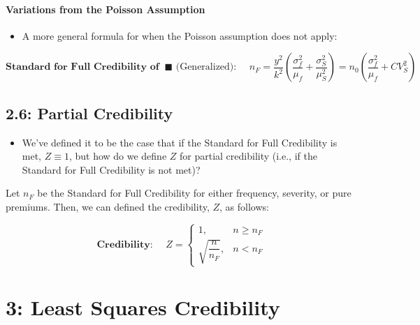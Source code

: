\documentclass[
]{article}
\providecommand{\tightlist}{%
  \setlength{\itemsep}{0pt}\setlength{\parskip}{0pt}}
\begin{document}
\begin{blue}

\hypertarget{variations-from-the-poisson-assumption}{%
\paragraph{Variations from the Poisson
Assumption}\label{variations-from-the-poisson-assumption}}

\begin{itemize}
\tightlist
\item
  A more general formula for when the Poisson assumption does not apply:
\end{itemize}

\[
  \textbf{Standard for Full Credibility of } \  \blacksquare \text{ (Generalized): } \quad n_F = \dfrac{y^2}{k^2}\left( \dfrac{\sigma_f^2}{\mu_f} + \dfrac{\sigma_S^2}{\mu_S^2} \right) = n_0 \left( \dfrac{\sigma_f^2}{\mu_f} + CV_S^2  \right)
\]

\end{blue}

\hypertarget{partial-credibility}{%
\subsection{2.6: Partial Credibility}\label{partial-credibility}}

\begin{itemize}
\tightlist
\item
  We've defined it to be the case that if the Standard for Full
  Credibility is met, \(Z\equiv 1\), but how do we define \(Z\) for
  partial credibility (i.e., if the Standard for Full Credibility is not
  met)?
\end{itemize}

\begin{green}

Let \(n_F\) be the Standard for Full Credibility for either frequency,
severity, or pure premiums. Then, we can defined the credibility, \(Z\),
as follows:

\[
  \textbf{Credibility: } \quad Z = \begin{cases}
        1, & n \ge n_F \\
        \sqrt{\dfrac{n}{n_F}},    & n < n_F
      \end{cases}
\]

\end{green}

\hypertarget{least-squares-credibility}{%
\section{3: Least Squares Credibility}\label{least-squares-credibility}}
\end{document}
